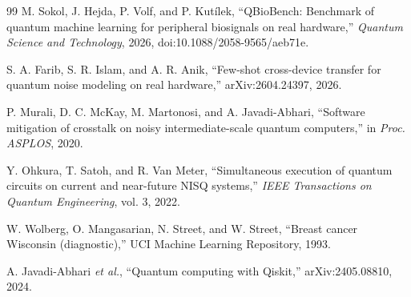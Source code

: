 \documentclass[10pt,conference]{IEEEtran}
\begin{document}
\begin{thebibliography}{99}
M. Sokol, J. Hejda, P. Volf, and P. Kut\'ilek, ``QBioBench: Benchmark of quantum machine learning
for peripheral biosignals on real hardware,'' \emph{Quantum Science and Technology}, 2026,
doi:10.1088/2058-9565/aeb71e.

S. A. Farib, S. R. Islam, and A. R. Anik, ``Few-shot cross-device transfer for quantum noise
modeling on real hardware,'' arXiv:2604.24397, 2026.

P. Murali, D. C. McKay, M. Martonosi, and A. Javadi-Abhari, ``Software mitigation of crosstalk on
noisy intermediate-scale quantum computers,'' in \emph{Proc. ASPLOS}, 2020.

Y. Ohkura, T. Satoh, and R. Van Meter, ``Simultaneous execution of quantum circuits on current and
near-future NISQ systems,'' \emph{IEEE Transactions on Quantum Engineering}, vol. 3, 2022.

W. Wolberg, O. Mangasarian, N. Street, and W. Street, ``Breast cancer Wisconsin (diagnostic),''
UCI Machine Learning Repository, 1993.

A. Javadi-Abhari \emph{et al.}, ``Quantum computing with Qiskit,'' arXiv:2405.08810, 2024.

\end{thebibliography}
\end{document}
